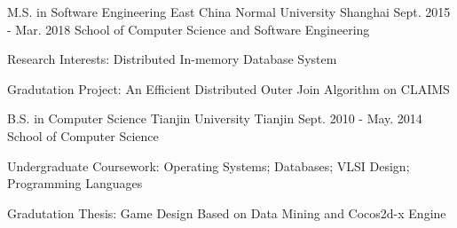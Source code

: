 \begin{cventries}
  \cventry
    {M.S. in Software Engineering}
    {East China Normal University}
    {Shanghai}
    {Sept. 2015 - Mar. 2018}
    {School of Computer Science and Software Engineering}
    {
      \begin{cvitems}
        \item {Research Interests: Distributed In-memory Database System}
        \item {Gradutation Project: An Efficient Distributed Outer Join Algorithm on CLAIMS}
      \end{cvitems}
    }
    \cventry
    {B.S. in Computer Science}
    {Tianjin University}
    {Tianjin}
    {Sept. 2010 - May. 2014}
    {School of Computer Science}
    {
      \begin{cvitems}
        \item {Undergraduate Coursework: Operating Systems; Databases; VLSI Design; Programming Languages}
        \item {Gradutation Thesis: Game Design Based on Data Mining and Cocos2d-x Engine}
      \end{cvitems}
    }
\end{cventries}

